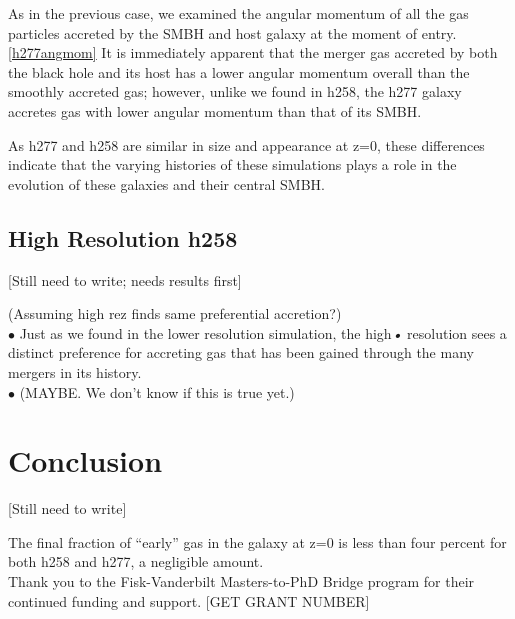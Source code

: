 \documentclass[manuscript]{aastex}
\begin{document}
As in the previous case, we examined the angular momentum of all the gas particles accreted by the SMBH and host galaxy at the moment of entry. \ref{h277angmom} It is immediately apparent that the merger gas accreted by both the black hole and its host has a lower angular momentum overall than the smoothly accreted gas; however, unlike we found in h258, the h277 galaxy accretes gas with lower angular momentum than that of its SMBH.

As h277 and h258 are similar in size and appearance at z=0, these differences indicate that the varying histories of these simulations plays a role in the evolution of these galaxies and their central SMBH.
	

\subsection{High Resolution h258}

[Still need to write; needs results first]

(Assuming high rez finds same preferential accretion?)\\
$\bullet$ Just as we found in the lower resolution simulation, the high\textit{•} resolution sees a distinct preference for accreting gas that has been gained through the many mergers in its history. \\
$\bullet$ (MAYBE. We don't know if this is true yet.)\\


\section{Conclusion}

[Still need to write]

The final fraction of ``early'' gas in the galaxy at z=0 is less than four percent for both h258 and h277, a negligible amount.  \\


\acknowledgments
Thank you to the Fisk-Vanderbilt Masters-to-PhD Bridge program for their continued funding and support. [GET GRANT NUMBER]

\end{document}
